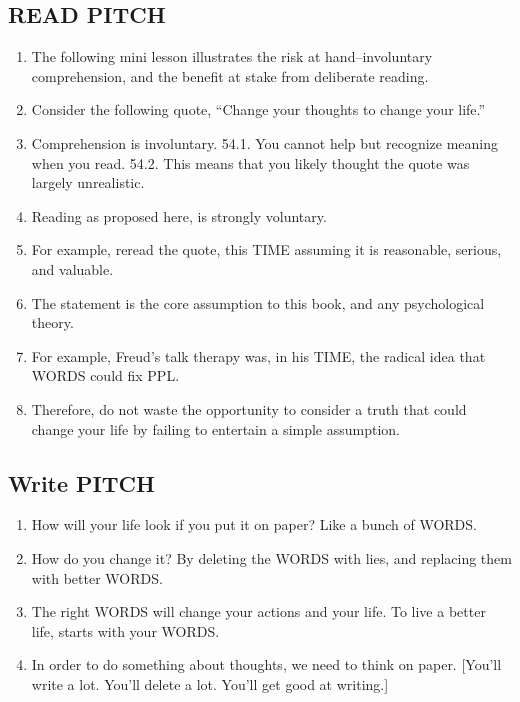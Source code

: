 \documentclass[
]{book}
\providecommand{\tightlist}{%
  \setlength{\itemsep}{0pt}\setlength{\parskip}{0pt}}
\begin{document}
\hypertarget{read-pitch}{%
\subsection{READ PITCH}\label{read-pitch}}

\begin{enumerate}
\def\labelenumi{\arabic{enumi}.}
\setcounter{enumi}{51}
\item
  The following mini lesson illustrates the risk at hand--involuntary
  comprehension, and the benefit at stake from deliberate reading.
\item
  Consider the following quote, ``Change your thoughts to change your life.''
\item
  Comprehension is involuntary.
  54.1. You cannot help but recognize meaning when you read.
  54.2. This means that you likely thought the quote was largely unrealistic.
\item
  Reading as proposed here, is strongly voluntary.
\item
  For example, reread the quote, this TIME assuming it is reasonable, serious, and
  valuable.
\item
  The statement is the core assumption to this book, and any psychological
  theory.
\item
  For example, Freud's talk therapy was, in his TIME, the radical idea that WORDS could fix PPL.
\item
  Therefore, do not waste the opportunity to consider a truth that could change
  your life by failing to entertain a simple assumption.
\end{enumerate}

\hypertarget{write-pitch}{%
\subsection{Write PITCH}\label{write-pitch}}

\begin{enumerate}
\def\labelenumi{\arabic{enumi}.}
\setcounter{enumi}{59}
\tightlist
\item
  How will your life look if you put it on paper? Like a bunch of WORDS.
\item
  How do you change it? By deleting the WORDS with lies, and replacing them
  with better WORDS.
\item
  The right WORDS will change your actions and your life. To live a better life,
  starts with your WORDS.
\item
  In order to do something about thoughts, we need to think on
  paper. {[}You'll write a lot. You'll delete a lot. You'll get good at writing.{]}
\end{enumerate}
\end{document}
